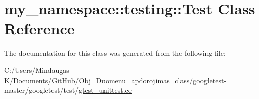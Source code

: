 \hypertarget{classmy__namespace_1_1testing_1_1_test}{}\section{my\+\_\+namespace\+::testing\+::Test Class Reference}
\label{classmy__namespace_1_1testing_1_1_test}


The documentation for this class was generated from the following file\+:\begin{DoxyCompactItemize}
\item 
C\+:/\+Users/\+Mindaugas K/\+Documents/\+Git\+Hub/\+Obj\+\_\+\+Duomenu\+\_\+apdorojimas\+\_\+class/googletest-\/master/googletest/test/\mbox{\hyperlink{googletest-master_2googletest_2test_2gtest__unittest_8cc}{gtest\+\_\+unittest.\+cc}}\end{DoxyCompactItemize}
